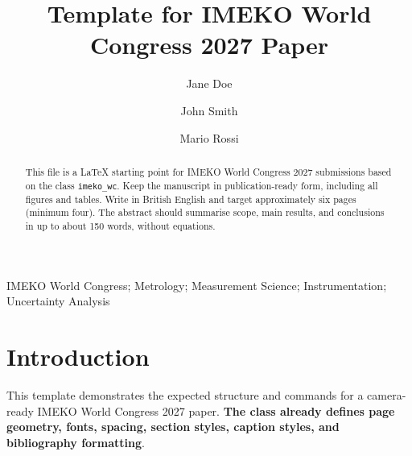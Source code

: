 \documentclass{imeko_wc}
\begin{document}
\title{Template for IMEKO World Congress 2027 Paper}

\author[a1]{Jane Doe}
\author[a1,a3]{John Smith}
\author[a2,a4]{Mario Rossi}




\maketitle %

\begin{abstract}
This file is a \LaTeX{} starting point for IMEKO World Congress 2027 submissions based on the class \texttt{imeko\_wc}. Keep the manuscript in publication-ready form, including all figures and tables. Write in British English and target approximately six pages (minimum four). The abstract should summarise scope, main results, and conclusions in up to about 150 words, without equations.
\end{abstract}

\begin{keywords}
IMEKO World Congress; Metrology; Measurement Science; Instrumentation; Uncertainty Analysis
\end{keywords}


\section{Introduction}

This template demonstrates the expected structure and commands for a camera-ready IMEKO World Congress 2027 paper. \textbf{The class already defines page geometry, fonts, spacing, section styles, caption styles, and bibliography formatting}.
\end{document}
